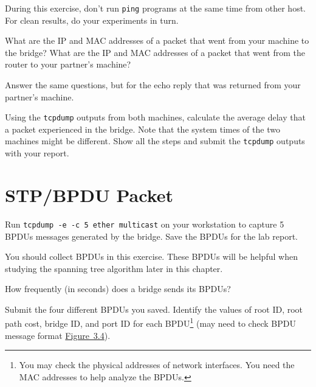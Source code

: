 \documentclass{../UTNetLab}
\begin{document}
    During this exercise, don’t run \lstinline{ping} programs at the same time from other host. For clean results, do your experiments in turn.
    
    \begin{report}
    \item What are the IP and MAC addresses of a packet that went from your machine to the bridge?
    What are the IP and MAC addresses of a packet that went from the router to your partner’s machine?

    \item Answer the same questions, but for the echo reply that was returned from your partner’s machine.
    \end{report}

    Using the \lstinline{tcpdump} outputs from both machines, calculate the average delay that a packet experienced in the bridge.
    Note that the system times of the two machines might be different.
    Show all the steps and submit the \lstinline{tcpdump} outputs with your report.


\section{STP/BPDU Packet}
    Run \lstinline{tcpdump -e -c 5 ether multicast} on your workstation to capture 5 BPDUs messages generated by the bridge.
    Save the BPDUs for the lab report.


    You should collect BPDUs in this exercise.
    These BPDUs will be helpful when studying the spanning tree algorithm later in this chapter.

    \begin{report}
    \item How frequently (in seconds) does a bridge sends its BPDUs?

    \item Submit the four different BPDUs you saved.
    Identify the values of root ID, root path cost, bridge ID, and port ID for each BPDU\footnote{You may check the physical addresses of network interfaces. You need the MAC addresses to help analyze the BPDUs.} (may need to check BPDU message format \hyperref[fig:3.4]{Figure~3.4}).
    \end{report}
\end{document}
